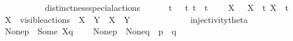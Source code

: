 \begin{isabellebody}
\ \ \ \ \ \ {\isacharparenleft}{\kern0pt}{\isacartoucheopen}{\isasymtheta}{\isacharquery}{\kern0pt}{\isacharbrackleft}{\kern0pt}{\isacharunderscore}{\kern0pt}{\isacharbrackright}{\kern0pt}{\isacharprime}{\kern0pt}{\isacharparenleft}{\kern0pt}{\isacharunderscore}{\kern0pt}{\isacharprime}{\kern0pt}{\isacharparenright}{\kern0pt}{\isacartoucheclose}{\isacharparenright}{\kern0pt}\isanewline
\ \ \isanewline
\ \ \ \ distinctness{\isacharunderscore}{\kern0pt}special{\isacharunderscore}{\kern0pt}actions{\isacharcolon}{\kern0pt}\isanewline
\ \ \ \ {\isacartoucheopen}{\isasymtau}\ {\isasymnoteq}\ t{\isacartoucheclose}\ {\isacartoucheopen}{\isasymtau}\ {\isasymnoteq}\ t{\isacharunderscore}{\kern0pt}{\isasymepsilon}{\isacartoucheclose}\ {\isacartoucheopen}t\ {\isasymnoteq}\ t{\isacharunderscore}{\kern0pt}{\isasymepsilon}{\isacartoucheclose}\isanewline
\ \ \ \ {\isacartoucheopen}{\isasymepsilon}{\isacharbrackleft}{\kern0pt}X{\isacharbrackright}{\kern0pt}\ {\isasymnoteq}\ {\isasymtau}{\isacartoucheclose}\ {\isacartoucheopen}{\isasymepsilon}{\isacharbrackleft}{\kern0pt}X{\isacharbrackright}{\kern0pt}\ {\isasymnoteq}\ t{\isacartoucheclose}\ {\isacartoucheopen}{\isasymepsilon}{\isacharbrackleft}{\kern0pt}X{\isacharbrackright}{\kern0pt}\ {\isasymnoteq}\ t{\isacharunderscore}{\kern0pt}{\isasymepsilon}{\isacartoucheclose}\ \isanewline
\ \ \ \ {\isacartoucheopen}X\ {\isasymsubseteq}\ visible{\isacharunderscore}{\kern0pt}actions\ {\isasymLongrightarrow}\ {\isasymepsilon}{\isacharbrackleft}{\kern0pt}X{\isacharbrackright}{\kern0pt}\ {\isacharequal}{\kern0pt}\ {\isasymepsilon}{\isacharbrackleft}{\kern0pt}Y{\isacharbrackright}{\kern0pt}\ {\isasymLongrightarrow}\ X\ {\isacharequal}{\kern0pt}\ Y{\isacartoucheclose}\isanewline
\ \ \ \ \isanewline
\ \ \ \ \isanewline
\ \ \ \ injectivity{\isacharunderscore}{\kern0pt}theta{\isacharcolon}{\kern0pt}\isanewline
\ \ \ \ {\isacartoucheopen}{\isasymtheta}{\isacharquery}{\kern0pt}{\isacharbrackleft}{\kern0pt}None{\isacharbrackright}{\kern0pt}{\isacharparenleft}{\kern0pt}p{\isacharparenright}{\kern0pt}\ {\isasymnoteq}\ {\isasymtheta}{\isacharquery}{\kern0pt}{\isacharbrackleft}{\kern0pt}Some\ X{\isacharbrackright}{\kern0pt}{\isacharparenleft}{\kern0pt}q{\isacharparenright}{\kern0pt}{\isacartoucheclose}\isanewline
\ \ \ \ {\isacartoucheopen}{\isacharparenleft}{\kern0pt}{\isasymtheta}{\isacharquery}{\kern0pt}{\isacharbrackleft}{\kern0pt}None{\isacharbrackright}{\kern0pt}{\isacharparenleft}{\kern0pt}p{\isacharparenright}{\kern0pt}\ {\isacharequal}{\kern0pt}\ {\isasymtheta}{\isacharquery}{\kern0pt}{\isacharbrackleft}{\kern0pt}None{\isacharbrackright}{\kern0pt}{\isacharparenleft}{\kern0pt}q{\isacharparenright}{\kern0pt}{\isacharparenright}{\kern0pt}\ {\isasymlongrightarrow}\ p\ {\isacharequal}{\kern0pt}\ q{\isacartoucheclose}\isanewline

\end{isabellebody}
